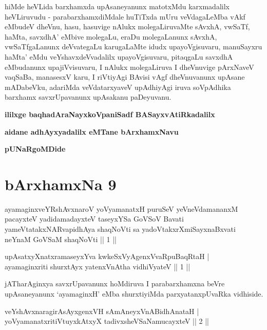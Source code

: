 
\begin{artha}
hiMde heVLida barxhamxda upAsaneyanunx matotxMdu karxmadalilx heVLiruvudu - parabarxhamxdiMdale huTiTxda mUru veVdagaLeMba vAkf eMbudeV dheVnu, hasu, hasuvige nAlukx molegaLiruvaMte sAvxhA, vwSaTf, haMta, savxdhA' eMbive molegaLu, eraDu molegaLanunx sAvxhA, vwSaTfgaLanunx deVvategaLu karugaLaMte idudx upayoVgisuvaru, manuSayxru haMta' eMdu veYshavxdeVvadalilx upayoVgisuvaru, pitaqgaLu savxdhA eMbudanunx upajiVvisuvaru, I nAlukx molegaLiruva I dheVnuvige pArxNaveV vaqSaBa, manasesxV karu, I riVtiyAgi BAvisi vAgf dheVnuvanunx upAsane mADabeVku, adariMda veVdatarxyaveV upAdhiyAgi iruva soVpAdhika barxhamx savxrUpavanunx upAsakanu paDeyuvanu.
\end{artha}

\begin{center}
{\bf ililxge baqhadAraNayxkoVpaniSadf BASayxvAtiRkadalilx}
\smallskip

{\bf aidane adhAyxyadalilx eMTane bArxhamxNavu}

{\bf pUNaRgoMDide}
\end{center}

\section*{bArxhamxNa 9}

\begin{shl}
ayamaginxveYRshAvxnaroV yoV\s yamanatxH puruSeV yeVneVdamananxM pacayxteV yadidamadayxteV taseyxYSa GoVSoV Bavati yameVtatakxNARvapidhAya shaqNoVti sa yadoVtakxrXmiSayxnaBxvati neYnaM GoVSaM shaqNoVti || 1 ||
\end{shl}


\begin{shl}
upAsatxyXnatxramaseyxYva kwkeSxVyAgenxVvaRpuBaqRtaH | \\
ayamaginxriti shurxtAyx yatenxVnAtha vidhiVyateV \hfill ||  1 || 
\end{shl}

\begin{artha}
jATharAginxya savxrUpavanunx hoMdiruva I parabarxhamxna beVre upAsaneyanunx `ayamaginxH' eMba shurxtiyiMda parxyatanxpUvaRka vidhiside.
\end{artha}


\begin{shl}
veYshAvxnaragirA\s sAyxgenxVH sAmAneyxVnABidhAnataH | \\
yoV\s yamanatxritiVtuyxkAtxyX tadivxsheVSaNamucayxteV \hfill ||  2 || 
\end{shl}

